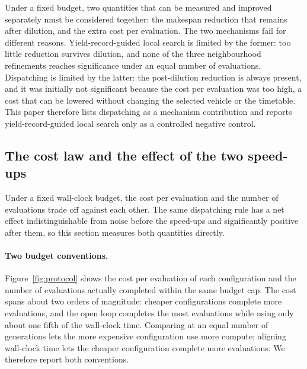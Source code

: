Under a fixed budget, two quantities that can be measured and improved separately must be considered together: the makespan reduction that remains after dilution, and the extra cost per evaluation.
The two mechanisms fail for different reasons. Yield-record-guided local search is limited by the former: too little reduction survives dilution, and none of the three neighbourhood refinements reaches significance under an equal number of evaluations.
Dispatching is limited by the latter: the post-dilution reduction is always present, and it was initially not significant because the cost per evaluation was too high, a cost that can be lowered without changing the selected vehicle or the timetable.
This paper therefore lists dispatching as a mechanism contribution and reports yield-record-guided local search only as a controlled negative control.


\subsection{The cost law and the effect of the two speed-ups}
\label{sec:costlaw}

Under a fixed wall-clock budget, the cost per evaluation and the number of evaluations trade off against each other. The same dispatching rule has a net effect indistinguishable from noise before the speed-ups and significantly positive after them, so this section measures both quantities directly.

\paragraph{Two budget conventions.}
Figure~\ref{fig:protocol} shows the cost per evaluation of each configuration and the number of evaluations actually completed within the same budget cap. The cost spans about two orders of magnitude: cheaper configurations complete more evaluations, and the open loop completes the most evaluations while using only about one fifth of the wall-clock time.
Comparing at an equal number of generations lets the more expensive configuration use more compute; aligning wall-clock time lets the cheaper configuration complete more evaluations. We therefore report both conventions.

